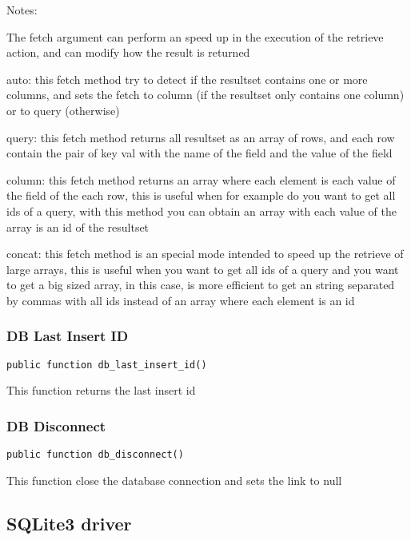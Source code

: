 \documentclass[a4paper]{article}
\begin{document}
Notes:

The fetch argument can perform an speed up in the execution of the retrieve action, and
can modify how the result is returned

auto: this fetch method try to detect if the resultset contains one or more columns, and
sets the fetch to column (if the resultset only contains one column) or to query (otherwise)

query: this fetch method returns all resultset as an array of rows, and each row contain the
pair of key val with the name of the field and the value of the field

column: this fetch method returns an array where each element is each value of the field of
the each row, this is useful when for example do you want to get all ids of a query, with
this method you can obtain an array with each value of the array is an id of the resultset

concat: this fetch method is an special mode intended to speed up the retrieve of large
arrays, this is useful when you want to get all ids of a query and you want to get a big
sized array, in this case, is more efficient to get an string separated by commas with all
ids instead of an array where each element is an id

\hypertarget{toc351}{}
\subsubsection{DB Last Insert ID}

\begin{lstlisting}
public function db_last_insert_id()
\end{lstlisting}

This function returns the last insert id

\hypertarget{toc352}{}
\subsubsection{DB Disconnect}

\begin{lstlisting}
public function db_disconnect()
\end{lstlisting}

This function close the database connection and sets the link to null

\hypertarget{toc353}{}
\subsection{SQLite3 driver}
\end{document}
